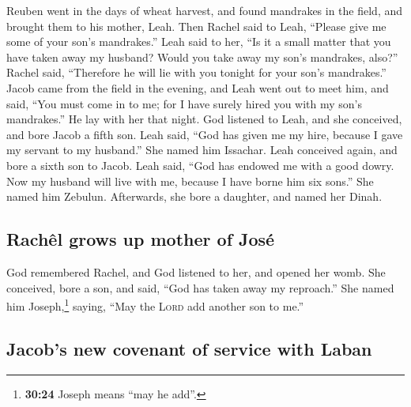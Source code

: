  Reuben went in the days of wheat harvest, and found
mandrakes in the field, and brought them to his mother, Leah. Then
Rachel said to Leah, ``Please give me some of your son's mandrakes.''
 Leah said to her, ``Is it a small matter that you have
taken away my husband? Would you take away my son's mandrakes, also?''
Rachel said, ``Therefore he will lie with you tonight for your son's
mandrakes.''  Jacob came from the field in the evening,
and Leah went out to meet him, and said, ``You must come in to me; for I
have surely hired you with my son's mandrakes.'' He lay with her that
night.  God listened to Leah, and she conceived, and bore
Jacob a fifth son.  Leah said, ``God has given me my
hire, because I gave my servant to my husband.'' She named him Issachar.
 Leah conceived again, and bore a sixth son to Jacob.
 Leah said, ``God has endowed me with a good dowry. Now
my husband will live with me, because I have borne him six sons.'' She
named him Zebulun.  Afterwards, she bore a daughter, and
named her Dinah.

\hypertarget{rachuxeal-grows-up-mother-of-josuxe9}{%
\subsection{Rachêl grows up mother of
José}\label{rachuxeal-grows-up-mother-of-josuxe9}}

 God remembered Rachel, and God listened to her, and
opened her womb.  She conceived, bore a son, and said,
``God has taken away my reproach.''  She named him
Joseph,\footnote{\textbf{30:24} Joseph means ``may he add''.} saying,
``May the \textsc{Lord} add another son to me.''

\hypertarget{jacobs-new-covenant-of-service-with-laban}{%
\subsection{Jacob's new covenant of service with
Laban}\label{jacobs-new-covenant-of-service-with-laban}}

